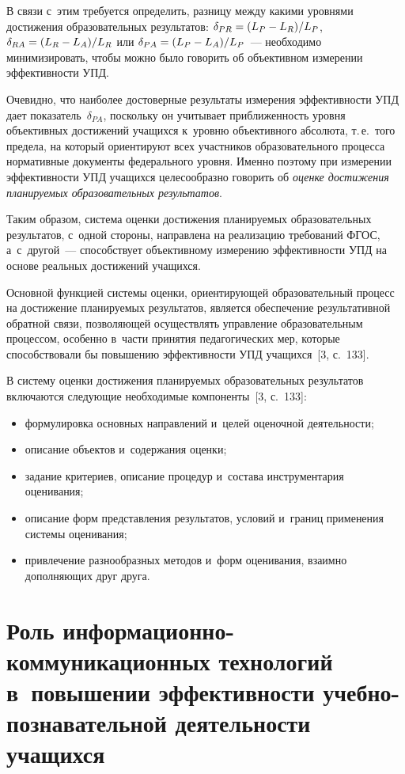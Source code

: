 \begin{multicols}{2}
  В связи с~этим требуется определить, разницу между какими уровнями достижения
образовательных результатов: $\delta_{PR}\hm= (L_P \hm- L_R)/L_P$, $\delta_{RA}\hm = (L_R
\hm- L_A)/L_R$ или $\delta_{PA}\hm = (L_P \hm- L_A)/L_P$~--- необходимо минимизировать,
чтобы можно было говорить об объективном измерении эффективности УПД.

  Очевидно, что наиболее достоверные результаты измерения эффективности УПД дает
показатель~$\delta_{PA}$, поскольку он учитывает приближенность уровня объективных
достижений учащихся к~уровню объективного абсолюта, т.\,е.\ того предела, на который
ориентируют всех участников образовательного процесса нормативные документы
федерального уровня. Именно поэтому при измерении эффективности УПД учащихся
целесообразно говорить об \textit{оценке достижения планируемых образовательных
результатов}.

  Таким образом, система оценки достижения планируемых образовательных результатов,
с~одной стороны, направлена на реализацию требований ФГОС, а~с~другой~--- способствует
объективному измерению эффективности УПД на основе реальных достижений учащихся.

  Основной функцией системы оценки, ориенти\-рующей образовательный процесс на
\mbox{достижение} планируемых результатов, является обеспечение результативной обратной связи,
позволяющей осущест\-влять управление образовательным процессом, особенно в~части
принятия педагогических мер, которые способствовали бы повышению эффективности УПД
учащихся~[3, с.~133].

  В систему оценки достижения планируемых образовательных результатов включаются
сле\-ду\-ющие необходимые компоненты~[3, с.~133]:
  \begin{itemize}
\item формулировка основных направлений и~целей оценочной деятельности;
\item описание объектов и~содержания оценки;
\item задание критериев, описание процедур и~состава инструментария оценивания;
\item описание форм представления результатов, условий и~границ применения системы
оценивания;
\item привлечение разнообразных методов и~форм оценивания, взаимно дополняющих друг
друга.
\end{itemize}

\section{Роль информационно-коммуникационных технологий
в~повышении эффективности учебно-познавательной
деятельности учащихся}


\end{multicols}
